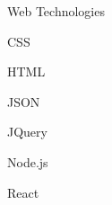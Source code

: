 \begin{skillset}{Web Technologies}
  \item CSS
  \item HTML
  \item JSON
  \item JQuery
  \item Node.js
  \item React
\end{skillset}
